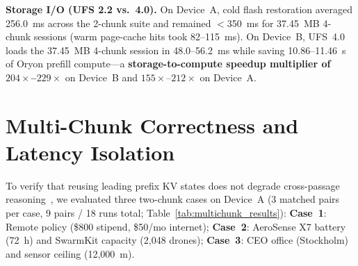 \documentclass[10pt,conference]{IEEEtran}
\begin{document}
\textbf{Storage I/O (UFS 2.2 vs.\ 4.0).} On Device~A, cold flash restoration averaged 256.0~ms across the 2-chunk suite and remained $<$350~ms for 37.45~MB 4-chunk sessions (warm page-cache hits took 82--115~ms). On Device~B, UFS~4.0 loads the 37.45~MB 4-chunk session in 48.0--56.2~ms while saving 10.86--11.46~s of Oryon prefill compute---a \textbf{storage-to-compute speedup multiplier of $204\times$--$229\times$} on Device~B and $155\times\text{--}212\times$ on Device~A.

\section{Multi-Chunk Correctness and Latency Isolation}
\label{sec:results_multichunk}
To verify that reusing leading prefix KV states does not degrade cross-passage reasoning~\cite{yang2018hotpotqa}, we evaluated three two-chunk cases on Device~A (3 matched pairs per case, 9 pairs / 18 runs total; Table~\ref{tab:multichunk_results}):
\textbf{Case~1}: Remote policy (\$800 stipend, \$50/mo internet);
\textbf{Case~2}: AeroSense X7 battery (72~h) and SwarmKit capacity (2,048 drones);
\textbf{Case~3}: CEO office (Stockholm) and sensor ceiling (12,000~m).

\begin{table}[!htbp]
\centering
\caption{Multi-chunk paired trials on Device~A (9 pairs; mean $\pm$ std over 3 reps). Tokens = base/reuse prefill tokens; Load = cold flash load (ms). Factual recall was 100\% across all rows.}
\label{tab:multichunk_results}
\scriptsize
\setlength{\tabcolsep}{1.9pt}
\renewcommand{\arraystretch}{0.98}
\end{table}
\end{document}
